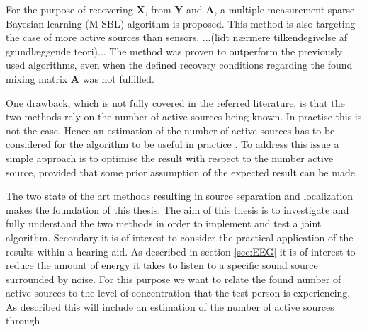 For the purpose of recovering $\textbf{X}$, from $\textbf{Y}$ and $\textbf{A}$, a multiple measurement sparse Bayesian learning (M-SBL) algorithm is proposed. This method is also targeting the case of more active sources than sensors. ...(lidt nærmere tilkendegivelse af grundlæggende teori)...
The method was proven to outperform the previously used algorithms, even when the defined recovery conditions regarding the found mixing matrix $\textbf{A}$ was not fulfilled\cite{Balkan2014}.

One drawback, which is not fully covered in the referred literature, is that the two methods rely on the number of active sources being known. 
In practise this is not the case. 
Hence an estimation of the number of active sources has to be considered for the algorithm to be useful in practice . To address this issue a simple approach is to optimise the result with respect to the number active source, provided that some prior assumption of the expected result can be made.      

The two state of the art methods resulting in source separation and localization makes the foundation of this thesis. 
The aim of this thesis is to investigate and fully understand the two methods in order to implement and test a joint algorithm. 
Secondary it is of interest to consider the practical application of the results within a hearing aid.  
As described in section \ref{sec:EEG} it is of interest to reduce the amount of energy it takes to listen to a specific sound source surrounded by noise.
For this purpose we want to relate the found number of active sources to the level of concentration that the test person is experiencing. 
As described this will include an estimation of the number of active sources through


 
